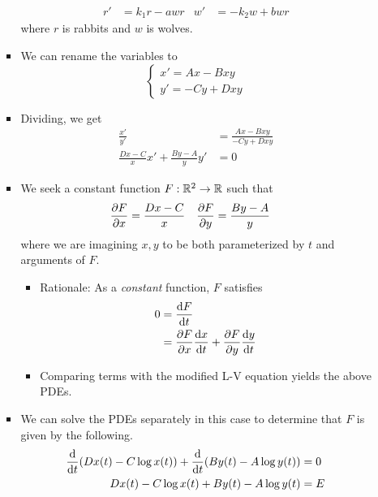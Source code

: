 \documentclass[../notes.tex]{subfiles}
\begin{document}
\begin{itemize}
\begin{enumerate}
\begin{itemize}
\begin{align*}
                r' &= k_1r-awr&
                w' &= -k_2w+bwr
            \end{align*}
            where $r$ is rabbits and $w$ is wolves.
            \item We can rename the variables to
            \begin{equation*}
                \begin{cases}
                    x' = Ax-Bxy\\
                    y' = -Cy+Dxy
                \end{cases}
            \end{equation*}
            \item Dividing, we get
            \begin{align*}
                \frac{x'}{y'} &= \frac{Ax-Bxy}{-Cy+Dxy}\\
                \frac{Dx-C}{x}x'+\frac{By-A}{y}y' &= 0
            \end{align*}
            \item We seek a constant function $F:\mathbb{R}^2\to\mathbb{R}$ such that
            \begin{align*}
                \pdv{F}{x} &= \frac{Dx-C}{x}&
                \pdv{F}{y} &= \frac{By-A}{y}
            \end{align*}
            where we are imagining $x,y$ to be both parameterized by $t$ and arguments of $F$.
            \begin{itemize}
                \item Rationale: As a \emph{constant} function, $F$ satisfies
                \begin{align*}
                    0 &= \dv{F}{t}\\
                    &= \pdv{F}{x}\dv{x}{t}+\pdv{F}{y}\dv{y}{t}
                \end{align*}
                \item Comparing terms with the modified L-V equation yields the above PDEs.
            \end{itemize}
            \item We can solve the PDEs separately in this case to determine that $F$ is given by the following.
            \begin{align*}
                \dv{t}(Dx(t)-C\log x(t))+\dv{t}(By(t)-A\log y(t)) &= 0\\
                Dx(t)-C\log x(t)+By(t)-A\log y(t) &= E
            \end{align*}
            \begin{itemize}

\end{itemize}
\end{itemize}
\end{enumerate}
\end{itemize}
\end{document}
